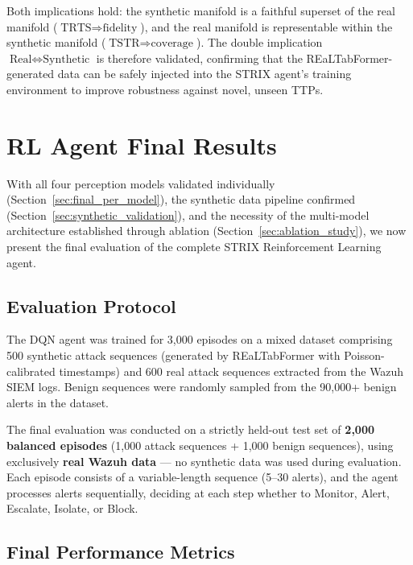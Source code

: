Both implications hold: the synthetic manifold is a faithful superset of the real manifold ($\text{TRTS} \Rightarrow \text{fidelity}$), and the real manifold is representable within the synthetic manifold ($\text{TSTR} \Rightarrow \text{coverage}$). The double implication $\text{Real} \Leftrightarrow \text{Synthetic}$ is therefore validated, confirming that the REaLTabFormer-generated data can be safely injected into the STRIX agent's training environment to improve robustness against novel, unseen TTPs.


\section{RL Agent Final Results}
\label{sec:rl_final_results}

With all four perception models validated individually (Section~\ref{sec:final_per_model}), the synthetic data pipeline confirmed (Section~\ref{sec:synthetic_validation}), and the necessity of the multi-model architecture established through ablation (Section~\ref{sec:ablation_study}), we now present the final evaluation of the complete STRIX Reinforcement Learning agent.

\subsection{Evaluation Protocol}

The DQN agent was trained for 3,000 episodes on a mixed dataset comprising 500 synthetic attack sequences (generated by REaLTabFormer with Poisson-calibrated timestamps) and 600 real attack sequences extracted from the Wazuh SIEM logs. Benign sequences were randomly sampled from the 90,000+ benign alerts in the dataset. 

The final evaluation was conducted on a strictly held-out test set of \textbf{2,000 balanced episodes} (1,000 attack sequences + 1,000 benign sequences), using exclusively \textbf{real Wazuh data} --- no synthetic data was used during evaluation. Each episode consists of a variable-length sequence (5--30 alerts), and the agent processes alerts sequentially, deciding at each step whether to Monitor, Alert, Escalate, Isolate, or Block.

\subsection{Final Performance Metrics}

